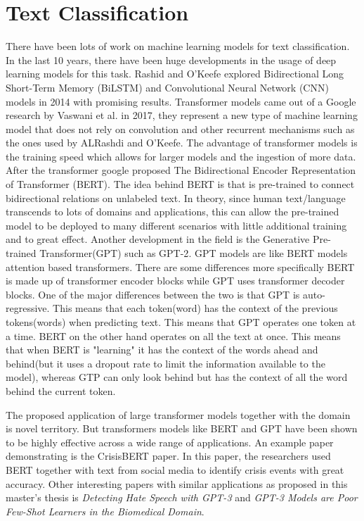 \section{Text Classification}
There have been lots of work on machine learning models for text classification. In the last 10 years, there have been huge developments in the usage of deep learning models for this task. Rashid and O’Keefe explored Bidirectional Long
Short-Term Memory (BiLSTM) and Convolutional Neural Network (CNN) models\cite{pennington2014glove} in 2014 with promising results. Transformer models came out of a Google research by Vaswani et al. in 2017\cite{vaswani2017attention}, they represent a new type of machine learning model that does not rely on convolution and other recurrent mechanisms such as the ones used by ALRashdi and O’Keefe. The advantage of transformer models is the training speed which allows for larger models and the ingestion of more data. After the transformer google proposed The Bidirectional Encoder Representation of Transformer (BERT)\cite{devlin2018bert}. The idea behind BERT is that is pre-trained to connect bidirectional relations on unlabeled text. In theory, since human text/language transcends to lots of domains and applications, this can allow the pre-trained model to be deployed to many different scenarios with little additional training and to great effect. Another development in the field is the Generative Pre-trained Transformer(GPT) such as GPT-2\cite{radford2019language}. GPT models are like BERT models attention based transformers. There are some differences more specifically BERT is made up of transformer encoder blocks while GPT uses transformer decoder blocks. One of the major differences between the two is that GPT is auto-regressive. This means that each token(word) has the context of the previous tokens(words) when predicting text. This means that GPT operates one token at a time. BERT on the other hand operates on all the text at once. This means that when BERT is "learning" it has the context of the words ahead and behind(but it uses a dropout rate to limit the information available to the model), whereas GTP can only look behind but has the context of all the word behind the current token.

The proposed application of large transformer models together with the domain is novel territory. But transformers models like BERT and GPT have been shown to be highly effective across a wide range of applications. An example paper demonstrating is the CrisisBERT paper\cite{liu2021crisisbert}. In this paper, the researchers used BERT together with text from social media to identify crisis events with great accuracy. Other interesting papers with similar applications as proposed in this master's thesis is \textit{Detecting Hate Speech with GPT-3}\cite{chiu2021detecting} and \textit{GPT-3 Models are Poor Few-Shot Learners in the Biomedical Domain}\cite{moradi2021gpt}.
